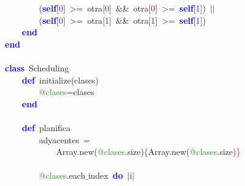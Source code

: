 \mbox{}\ \ \ \ \ \ \ \ \textcolor{BrickRed}{(}\textbf{\textcolor{Blue}{self}}\textcolor{BrickRed}{[}\textcolor{Purple}{0}\textcolor{BrickRed}{]}\ \textcolor{BrickRed}{\textgreater{}=}\ otra\textcolor{BrickRed}{[}\textcolor{Purple}{0}\textcolor{BrickRed}{]}\ \textcolor{BrickRed}{\&\&}\ otra\textcolor{BrickRed}{[}\textcolor{Purple}{0}\textcolor{BrickRed}{]}\ \textcolor{BrickRed}{\textgreater{}=}\ \textbf{\textcolor{Blue}{self}}\textcolor{BrickRed}{[}\textcolor{Purple}{1}\textcolor{BrickRed}{])}\ \textcolor{BrickRed}{$|$$|$}\  \\
\mbox{}\ \ \ \ \ \ \ \ \textcolor{BrickRed}{(}\textbf{\textcolor{Blue}{self}}\textcolor{BrickRed}{[}\textcolor{Purple}{0}\textcolor{BrickRed}{]}\ \textcolor{BrickRed}{\textgreater{}=}\ otra\textcolor{BrickRed}{[}\textcolor{Purple}{1}\textcolor{BrickRed}{]}\ \textcolor{BrickRed}{\&\&}\ otra\textcolor{BrickRed}{[}\textcolor{Purple}{1}\textcolor{BrickRed}{]}\ \textcolor{BrickRed}{\textgreater{}=}\ \textbf{\textcolor{Blue}{self}}\textcolor{BrickRed}{[}\textcolor{Purple}{1}\textcolor{BrickRed}{])} \\
\mbox{}\ \ \ \ \textbf{\textcolor{Blue}{end}} \\
\mbox{}\textbf{\textcolor{Blue}{end}} \\
\mbox{} \\
\mbox{}\textbf{\textcolor{Blue}{class}}\ Scheduling \\
\mbox{}\ \ \ \ \textbf{\textcolor{Blue}{def}}\ initialize\textcolor{BrickRed}{(}clases\textcolor{BrickRed}{)} \\
\mbox{}\ \ \ \ \ \ \ \ \textcolor{ForestGreen}{@clases}\textcolor{BrickRed}{=}clases \\
\mbox{}\ \ \ \ \textbf{\textcolor{Blue}{end}} \\
\mbox{}\ \ \ \  \\
\mbox{}\ \ \ \ \textbf{\textcolor{Blue}{def}}\ planifica \\
\mbox{}\ \ \ \ \ \ \ \ adyacentes\ \textcolor{BrickRed}{=}\  \\
\mbox{}\ \ \ \ \ \ \ \ \ \ \ \ Array\textcolor{BrickRed}{.}new\textcolor{BrickRed}{(}\textcolor{ForestGreen}{@clases}\textcolor{BrickRed}{.}size\textcolor{BrickRed}{)}\textcolor{Red}{\{}Array\textcolor{BrickRed}{.}new\textcolor{BrickRed}{(}\textcolor{ForestGreen}{@clases}\textcolor{BrickRed}{.}size\textcolor{BrickRed}{)}\textcolor{Red}{\}} \\
\mbox{}\ \ \ \ \ \ \ \  \\
\mbox{}\ \ \ \ \ \ \ \ \textcolor{ForestGreen}{@clases}\textcolor{BrickRed}{.}each$\_$index\ \textbf{\textcolor{Blue}{do}}\ \textcolor{BrickRed}{$|$}i\textcolor{BrickRed}{$|$} \\
